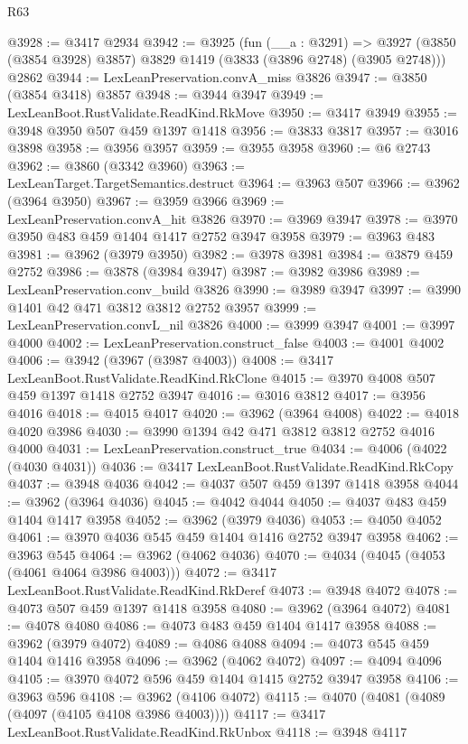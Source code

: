 \begin{lexlean}{R63}
\begin{coremodule}
@3928 := @3417 @2934
@3942 := @3925
    (fun (__a : @3291) =>
    @3927 (@3850 (@3854 @3928) @3857) @3829 @1419 (@3833 (@3896 @2748) (@3905 @2748)))
    @2862
@3944 := LexLeanPreservation.convA_miss @3826
@3947 := @3850 (@3854 @3418) @3857
@3948 := @3944 @3947
@3949 := LexLeanBoot.RustValidate.ReadKind.RkMove
@3950 := @3417 @3949
@3955 := @3948 @3950 @507 @459 @1397 @1418
@3956 := @3833 @3817
@3957 := @3016 @3898
@3958 := @3956 @3957
@3959 := @3955 @3958
@3960 := @6 @2743
@3962 := @3860 (@3342 @3960)
@3963 := LexLeanTarget.TargetSemantics.destruct
@3964 := @3963 @507
@3966 := @3962 (@3964 @3950)
@3967 := @3959 @3966
@3969 := LexLeanPreservation.convA_hit @3826
@3970 := @3969 @3947
@3978 := @3970 @3950 @483 @459 @1404 @1417 @2752 @3947 @3958
@3979 := @3963 @483
@3981 := @3962 (@3979 @3950)
@3982 := @3978 @3981
@3984 := @3879 @459 @2752
@3986 := @3878 (@3984 @3947)
@3987 := @3982 @3986
@3989 := LexLeanPreservation.conv_build @3826
@3990 := @3989 @3947
@3997 := @3990 @1401 @42 @471 @3812 @3812 @2752 @3957
@3999 := LexLeanPreservation.convL_nil @3826
@4000 := @3999 @3947
@4001 := @3997 @4000
@4002 := LexLeanPreservation.construct_false
@4003 := @4001 @4002
@4006 := @3942 (@3967 (@3987 @4003))
@4008 := @3417 LexLeanBoot.RustValidate.ReadKind.RkClone
@4015 := @3970 @4008 @507 @459 @1397 @1418 @2752 @3947
@4016 := @3016 @3812
@4017 := @3956 @4016
@4018 := @4015 @4017
@4020 := @3962 (@3964 @4008)
@4022 := @4018 @4020 @3986
@4030 := @3990 @1394 @42 @471 @3812 @3812 @2752 @4016 @4000
@4031 := LexLeanPreservation.construct_true
@4034 := @4006 (@4022 (@4030 @4031))
@4036 := @3417 LexLeanBoot.RustValidate.ReadKind.RkCopy
@4037 := @3948 @4036
@4042 := @4037 @507 @459 @1397 @1418 @3958
@4044 := @3962 (@3964 @4036)
@4045 := @4042 @4044
@4050 := @4037 @483 @459 @1404 @1417 @3958
@4052 := @3962 (@3979 @4036)
@4053 := @4050 @4052
@4061 := @3970 @4036 @545 @459 @1404 @1416 @2752 @3947 @3958
@4062 := @3963 @545
@4064 := @3962 (@4062 @4036)
@4070 := @4034 (@4045 (@4053 (@4061 @4064 @3986 @4003)))
@4072 := @3417 LexLeanBoot.RustValidate.ReadKind.RkDeref
@4073 := @3948 @4072
@4078 := @4073 @507 @459 @1397 @1418 @3958
@4080 := @3962 (@3964 @4072)
@4081 := @4078 @4080
@4086 := @4073 @483 @459 @1404 @1417 @3958
@4088 := @3962 (@3979 @4072)
@4089 := @4086 @4088
@4094 := @4073 @545 @459 @1404 @1416 @3958
@4096 := @3962 (@4062 @4072)
@4097 := @4094 @4096
@4105 := @3970 @4072 @596 @459 @1404 @1415 @2752 @3947 @3958
@4106 := @3963 @596
@4108 := @3962 (@4106 @4072)
@4115 := @4070 (@4081 (@4089 (@4097 (@4105 @4108 @3986 @4003))))
@4117 := @3417 LexLeanBoot.RustValidate.ReadKind.RkUnbox
@4118 := @3948 @4117

\end{coremodule}
\end{lexlean}
